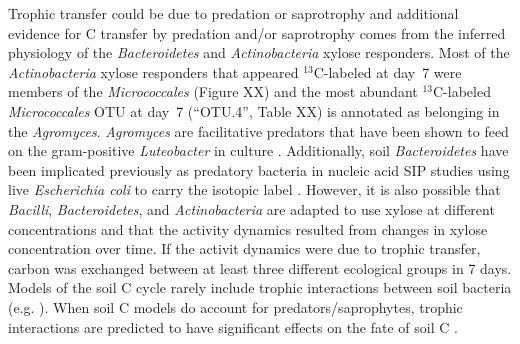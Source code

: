 Trophic transfer could be due to predation or saprotrophy and additional
evidence for C transfer by predation and/or saprotrophy comes from the inferred
physiology of the \textit{Bacteroidetes} and \textit{Actinobacteria} xylose
responders. Most of the \textit{Actinobacteria} xylose responders that appeared
$^{13}$C-labeled at day~7 were members of the \textit{Micrococcales} (Figure
XX) and the most abundant $^{13}$C-labeled \textit{Micrococcales} OTU at day~7
(“OTU.4”, Table XX) is annotated as belonging in the \textit{Agromyces}.
\textit{Agromyces} are facilitative predators that have been shown to feed on
the gram-positive \textit{Luteobacter} in culture \citep{16346402}.
Additionally, soil \textit{Bacteroidetes} have been implicated previously as
predatory bacteria in nucleic acid SIP studies using live \textit{Escherichia
coli} to carry the isotopic label \citep{Lueders2006}. However, it is also
possible that \textit{Bacilli}, \textit{Bacteroidetes}, and
\textit{Actinobacteria} are adapted to use xylose at different concentrations
and that the activity dynamics resulted from changes in xylose concentration
over time. If the activit dynamics were due to trophic transfer, carbon was
exchanged between at least three different ecological groups in 7 days. Models
of the soil C cycle rarely include trophic interactions between soil bacteria
(e.g. \citep{Moore1988}). When soil C models do account for
predators/saprophytes, trophic interactions are predicted to have significant
effects on the fate of soil C \citep{Kaiser2014a}. 


